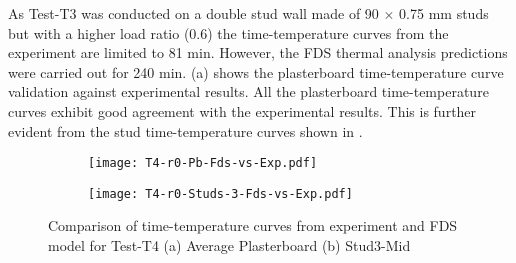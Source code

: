 As Test-T3 was conducted on a double stud wall made of 90 $\times$ 0.75 mm studs but with a higher load ratio (0.6) the time-temperature curves from the experiment are limited to 81 min. However, the FDS thermal analysis predictions were carried out for 240 min.  (a) shows the plasterboard time-temperature curve validation against experimental results. All the plasterboard time-temperature curves exhibit good agreement with the experimental results. This is further evident from the stud time-temperature curves shown in .
\begin{figure}[!htbp]
	\centering
	\begin{subfigure}[b]{0.7\textwidth}
		\centering
		\texttt{[image: T4-r0-Pb-Fds-vs-Exp.pdf]}
		\caption{}
		\label{subfig:T4-r0-Pb-Fds-vs-Exp}
	\end{subfigure}
	\begin{subfigure}[b]{0.6\textwidth}
		\centering
		\texttt{[image: T4-r0-Studs-3-Fds-vs-Exp.pdf]}
		\caption{}
		\label{subfig:T4-r0-Studs-3-Fds-vs-Exp}
	\end{subfigure}
	   \caption{Comparison of time-temperature curves from experiment and FDS model for Test-T4 (a) Average Plasterboard (b) Stud3-Mid}
	   \label{fig:fds-output-pb-studs-t4}
\end{figure}

